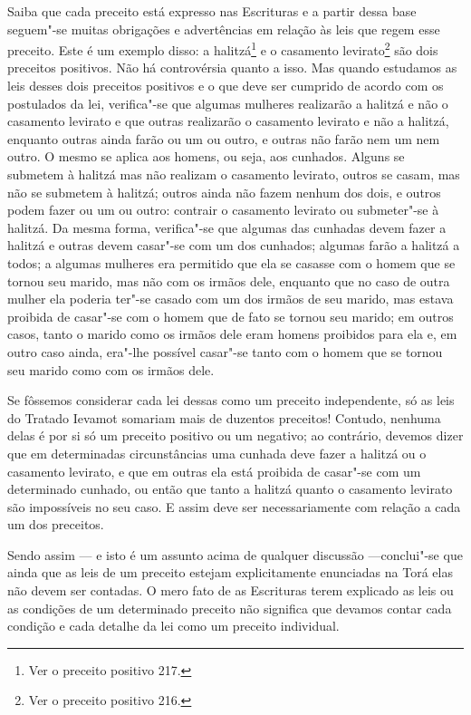 Saiba que cada preceito está expresso nas Escrituras e a partir dessa
base seguem"-se muitas obrigações e advertências em relação às leis que
regem esse preceito. Este é um exemplo disso: a
halitzá\starr\footnote{Ver o preceito positivo 217.} e o casamento
levirato\starr\footnote{Ver o preceito positivo 216.} são dois preceitos positivos. Não há
controvérsia quanto a isso. Mas quando estudamos as leis desses dois
preceitos positivos e o que deve ser cumprido de acordo com os
postulados da lei, verifica"-se que algumas mulheres realizarão a
halitzá\starr{} e não o casamento levirato\starr{} e que outras realizarão o
casamento levirato\starr{} e não a halitzá\starr, enquanto outras ainda farão ou
um ou outro, e outras não farão nem um nem outro. O mesmo se aplica aos
homens, ou seja, aos cunhados. Alguns se submetem à halitzá\starr{} mas não
realizam o casamento levirato\starr, outros se casam, mas não se submetem à
halitzá\starr; outros ainda não fazem nenhum dos dois, e outros podem
fazer ou um ou outro: contrair o casamento levirato\starr{} ou submeter"-se à
halitzá\starr. Da mesma forma, verifica"-se que algumas das cunhadas devem
fazer a halitzá\starr{} e outras devem casar"-se com um dos cunhados; algumas
farão a halitzá\starr{} a todos; a algumas mulheres era permitido que ela se
casasse com o homem que se tornou seu marido, mas não com os irmãos
dele, enquanto que no caso de outra mulher ela poderia ter"-se casado com
um dos irmãos de seu marido, mas estava proibida de casar"-se com o homem
que de fato se tornou seu marido; em outros casos, tanto o marido como
os irmãos dele eram homens proibidos para ela e, em outro caso ainda,
era"-lhe possível casar"-se tanto com o homem que se tornou seu marido
como com os irmãos dele.

Se fôssemos considerar cada lei dessas como um preceito independente,
só as leis do Tratado Ievamot\starr{} somariam mais de duzentos preceitos!
Contudo, nenhuma delas é por si só um preceito positivo ou um negativo;
ao contrário, devemos dizer que em determinadas circunstâncias uma
cunhada deve fazer a halitzá\starr{} ou o casamento levirato\starr, e que em
outras ela está proibida de casar"-se com um determinado cunhado, ou
então que tanto a halitzá\starr{} quanto o casamento levirato\starr{} são
impossíveis no seu caso. E assim deve ser necessariamente com relação a
cada um dos preceitos.

Sendo assim --- e isto é um assunto acima de qualquer discussão
---conclui"-se que ainda que as leis de um preceito estejam
explicitamente enunciadas na Torá\starr{} elas não devem ser contadas. O mero
fato de as Escrituras terem explicado as leis ou as condições de um
determinado preceito não significa que devamos contar cada condição e
cada detalhe da lei como um preceito individual.

